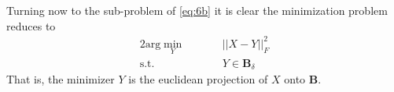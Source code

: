 \documentclass{article}
\begin{document}
Turning now to the sub-problem of \ref{eq:6b} it is clear the minimization problem reduces to
\begin{alignat}{2} \label{eq:3}
\textrm{arg} \min_Y & \quad &&||X-Y||^2_F \\
\textrm{s.t.}& &&Y \in \textbf{B}_\delta \nonumber
\end{alignat}
 That is, the minimizer $Y$ is the euclidean projection of $X$ onto $\textbf{B}$.




 
\end{document}
